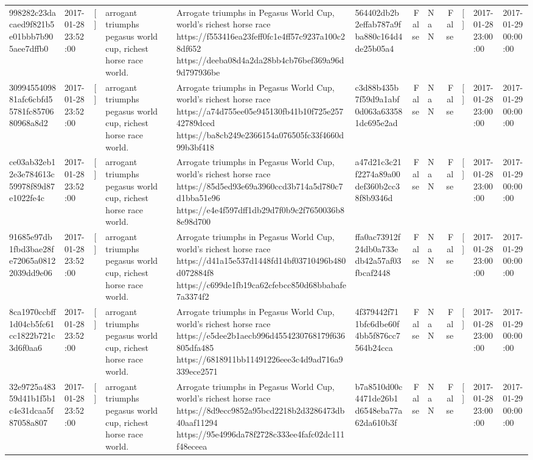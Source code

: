 \begin{tabular}{llllllrlrlll}
998282c23dacaed9f821b5e01bbb7b905aee7dffb0 & 2017-01-28 23:52:00 & [] & arrogant triumphs pegasus world cup, richest horse race world. & Arrogate triumphs in Pegasus World Cup, world's richest horse race https://f553416ea23feff0fc1e4ff57c9237a100c28df652 https://deeba08d4a2da28bb4cb76bef369a96d9d797936be & 564402db2b2effab787a9fba880c164d4de25b05a4 & False & NaN & False & [] & 2017-01-28 23:00:00 & 2017-01-29 00:00:00 \\
3099455409881afc6cbfd55781fc8570680968a8d2 & 2017-01-28 23:52:00 & [] & arrogant triumphs pegasus world cup, richest horse race world. & Arrogate triumphs in Pegasus World Cup, world's richest horse race https://a74d755ee05e945130fb41b10f725e25742789dced https://ba8cb249e2366154a076505fc33f4660d99b3bf418 & c3d88b435b7f59d9a1abf0d063a633581dc695e2ad & False & NaN & False & [] & 2017-01-28 23:00:00 & 2017-01-29 00:00:00 \\
ce03ab32eb12e3e784613c59978f89d87e1022fe4c & 2017-01-28 23:52:00 & [] & arrogant triumphs pegasus world cup, richest horse race world. & Arrogate triumphs in Pegasus World Cup, world's richest horse race https://85d5ed93e69a3960ccd3b714a5d780c7d1bba51e96 https://e4e4f597dff1db29d7f0b9c2f7650036b88e98d700 & a47d21c3c21f2274a89a00def360b2cc38f8b9346d & False & NaN & False & [] & 2017-01-28 23:00:00 & 2017-01-29 00:00:00 \\
91685e97db1fbd3bae28fe72065a08122039dd9e06 & 2017-01-28 23:52:00 & [] & arrogant triumphs pegasus world cup, richest horse race world. & Arrogate triumphs in Pegasus World Cup, world's richest horse race https://d41a15e537d1448fd14bf03710496b480d072884f8 https://c699de1fb19ca62cfebcc850d68bbabafe7a3374f2 & ffa0ac73912f24db0a733edb42a57af03fbcaf2448 & False & NaN & False & [] & 2017-01-28 23:00:00 & 2017-01-29 00:00:00 \\
8ca1970ccbff1d04cb5fc61cc1822b721c3d6f0aa6 & 2017-01-28 23:52:00 & [] & arrogant triumphs pegasus world cup, richest horse race world. & Arrogate triumphs in Pegasus World Cup, world's richest horse race https://e5dee2b1aecb996d4554230768179f636805dfa485 https://6818911bb11491226eee3c4d9ad716a9339ece2571 & 4f379442f711bfc6dbe60f4bb5f876cc7564b24cca & False & NaN & False & [] & 2017-01-28 23:00:00 & 2017-01-29 00:00:00 \\
32e9725a48359d41b1f5b1c4e31dcaa5f87058a807 & 2017-01-28 23:52:00 & [] & arrogant triumphs pegasus world cup, richest horse race world. & Arrogate triumphs in Pegasus World Cup, world's richest horse race https://8d9ecc9852a95bcd2218b2d3286473db40aaf11294 https://95e4996da78f2728c333ee4fafc02dc111f48eceea & b7a8510d00c4471de26b1d6548eba77a62da610b3f & False & NaN & False & [] & 2017-01-28 23:00:00 & 2017-01-29 00:00:00 \\

\end{tabular}
